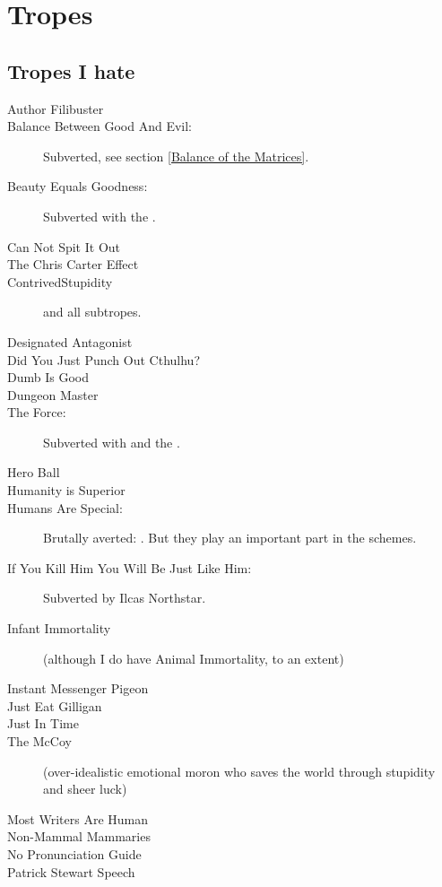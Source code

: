 
\chapter{Tropes}
\begin{flushleft}
\section{Tropes I hate}
\begin{description}
  \item[Author Filibuster] 
  \item[Balance Between Good And Evil:] 
    Subverted, see section \ref{Balance of the Matrices}.
  \item[Beauty Equals Goodness:] Subverted with the \resphain.
  \item[Can Not Spit It Out] 
  \item[The Chris Carter Effect] 
  \item[ContrivedStupidity] and all subtropes. 
  \item[Designated Antagonist] 
  \item[Did You Just Punch Out Cthulhu?]
  \item[Dumb Is Good]
  \item[Dungeon Master]
  \item[The Force:] Subverted with \iquin{} and the \sephiroth.
  \item[Hero Ball]
  \item[Humanity is Superior]
  \item[Humans Are Special:] 
    Brutally averted: 
    . 
    But they play an important part in the \pps{\banelords} schemes. 
  \item[If You Kill Him You Will Be Just Like Him:] 
    Subverted by Ilcas Northstar. 
  \item[Infant Immortality]
    (although I do have Animal Immortality, to an extent)
  \item[Instant Messenger Pigeon] 
  \item[Just Eat Gilligan]
  \item[Just In Time]
  \item[The McCoy]
    (over-idealistic emotional moron who saves the world through stupidity and sheer luck)
  \item[Most Writers Are Human] 
  \item[Non-Mammal Mammaries]
  \item[No Pronunciation Guide]
  \item[Patrick Stewart Speech] 

\end{description}
\end{flushleft}
